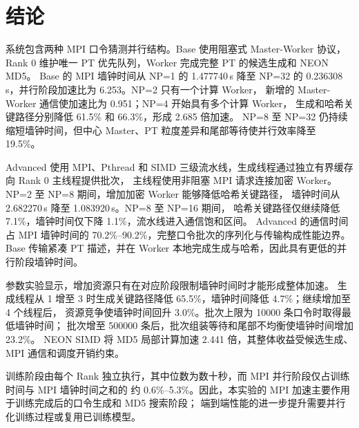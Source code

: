 \documentclass[UTF8,a4paper,12pt]{ctexart}
\newcommand{\seconds}[1]{#1\,s}
\begin{document}
\clearpage
\section{结论}

系统包含两种 MPI 口令猜测并行结构。Base 使用阻塞式 Master-Worker 协议，
Rank 0 维护唯一 PT 优先队列，Worker 完成完整 PT 的候选生成和 NEON MD5。
Base 的 MPI 墙钟时间从 NP=1 的 \seconds{1.477740} 降至 NP=32 的
\seconds{0.236308}，并行阶段加速比为 6.253。NP=2 只有一个计算 Worker，
新增的 Master-Worker 通信使加速比为 0.951；NP=4 开始具有多个计算 Worker，
生成和哈希关键路径分别降低 61.5\% 和 66.3\%，形成 2.685 倍加速。
NP=8 至 NP=32 仍持续缩短墙钟时间，但中心 Master、PT 粒度差异和尾部等待使并行效率降至 19.5\%。

Advanced 使用 MPI、Pthread 和 SIMD 三级流水线，生成线程通过独立有界缓存向 Rank 0 主线程提供批次，
主线程使用非阻塞 MPI 请求连接加密 Worker。NP=2 至 NP=8 期间，增加加密 Worker 能够降低哈希关键路径，
墙钟时间从 \seconds{2.682270} 降至 \seconds{1.083920}。NP=8 至 NP=16 期间，
哈希关键路径仅继续降低 7.1\%，墙钟时间仅下降 1.1\%，流水线进入通信饱和区间。
Advanced 的通信时间占 MPI 墙钟时间的 70.2\%--90.2\%，完整口令批次的序列化与传输构成性能边界。
Base 传输紧凑 PT 描述，并在 Worker 本地完成生成与哈希，因此具有更低的并行阶段墙钟时间。

参数实验显示，增加资源只有在对应阶段限制墙钟时间时才能形成整体加速。
生成线程从 1 增至 3 时生成关键路径降低 65.5\%，墙钟时间降低 4.7\%；继续增加至 4 个线程后，
资源竞争使墙钟时间回升 3.0\%。批次上限为 10000 条口令时取得最低墙钟时间；
批次增至 500000 条后，批次组装等待和尾部不均衡使墙钟时间增加 23.2\%。
NEON SIMD 将 MD5 局部计算加速 2.441 倍，其整体收益受候选生成、MPI 通信和调度开销约束。

训练阶段由每个 Rank 独立执行，其中位数为数十秒，而 MPI 并行阶段仅占训练时间与 MPI 墙钟时间之和的
约 0.6\%--5.3\%。因此，本实验的 MPI 加速主要作用于训练完成后的口令生成和 MD5 搜索阶段；
端到端性能的进一步提升需要并行化训练过程或复用已训练模型。
\end{document}
